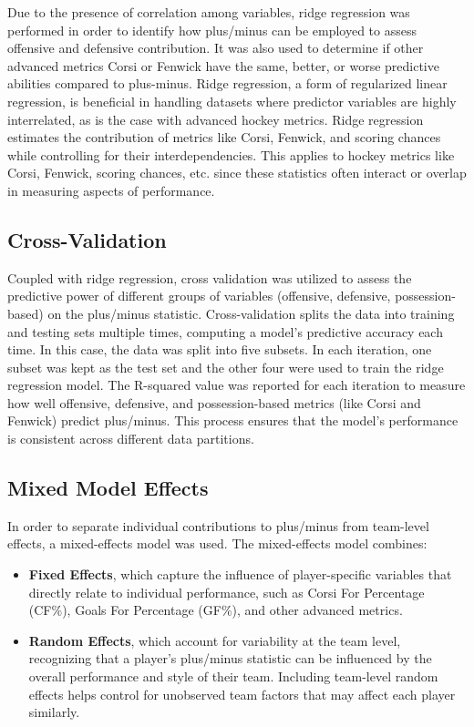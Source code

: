\documentclass[12pt]{article}
\begin{document}
Due to the presence of correlation among variables, ridge regression was performed in order to identify how plus/minus can be employed 
to assess offensive and defensive contribution. It was also used to determine if other advanced metrics Corsi or Fenwick have the same, 
better, or worse predictive abilities compared to plus-minus. Ridge regression, a form of regularized linear regression, is beneficial 
in handling datasets where predictor variables are highly interrelated, as is the case with advanced hockey metrics. Ridge regression 
estimates the contribution of metrics like Corsi, Fenwick, and scoring chances while controlling for their interdependencies. This 
applies to hockey metrics like Corsi, Fenwick, scoring chances, etc. since these statistics often interact or overlap in measuring aspects 
of performance.

\subsection{Cross-Validation}

Coupled with ridge regression, cross validation was utilized to assess the predictive power of different groups of variables (offensive, 
defensive, possession-based) on the plus/minus statistic. Cross-validation splits the data into training and testing sets multiple times, 
computing a model's predictive accuracy each time. In this case, the data was split into five subsets. In each iteration, one subset was
kept as the test set and the other four were used to train the ridge regression model. The R-squared value was reported for each iteration
to measure how well offensive, defensive, and possession-based metrics (like Corsi and Fenwick) predict plus/minus. This process ensures 
that the model’s performance is consistent across different data partitions.

\subsection{Mixed Model Effects}

In order to separate individual contributions to plus/minus from team-level effects, a mixed-effects model was used. 
The mixed-effects model combines:
\begin{itemize}
    \item \textbf{Fixed Effects}, which capture the influence of player-specific variables that directly relate to individual performance, 
    such as Corsi For Percentage (CF\%), Goals For Percentage (GF\%), and other advanced metrics.
    \item \textbf{Random Effects}, which account for variability at the team level, recognizing that a player’s plus/minus statistic can be 
    influenced by the overall performance and style of their team. Including team-level random effects helps control for unobserved team 
    factors that may affect each player similarly.
\end{itemize}
\end{document}
